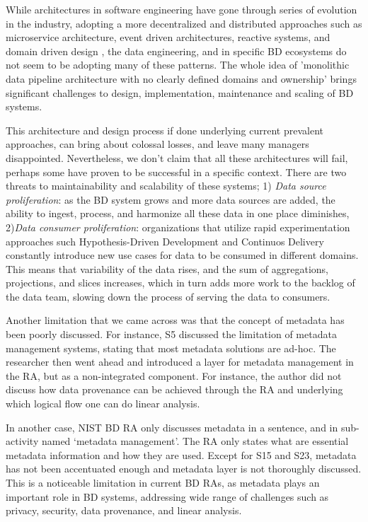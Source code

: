 \documentclass[review]{elsarticle}
\begin{document}
While architectures in software engineering have gone through series of evolution in the industry, adopting a more decentralized and distributed approaches such as microservice architecture, event driven architectures, reactive systems, and domain driven design , the data engineering, and in specific BD ecosystems do not seem to be adopting many of these patterns. The whole idea of 'monolithic data
pipeline architecture with no clearly defined domains and ownership' brings significant challenges to design, implementation, maintenance and scaling of BD systems.

This architecture and design process if done underlying current prevalent approaches, can bring about colossal losses, and leave many managers disappointed.
Nevertheless, we don't claim that all these architectures will fail, perhaps some have proven to be successful in a specific context. There are two threats to maintainability and scalability of these systems; 1) \emph{Data source proliferation}: as the BD system grows and more data
sources are added, the ability to ingest, process, and harmonize all these data in one place diminishes, 2)\emph{Data consumer proliferation}: organizations that utilize rapid experimentation approaches such Hypothesis-Driven Development and Continuos Delivery constantly introduce new use cases for data to be consumed in different domains. This means that variability of the data rises, and the sum of aggregations, projections, and slices increases, which in turn adds more work to the backlog of the data team, slowing
down the process of serving the data to consumers.

Another limitation that we came across was that the concept of metadata has been poorly discussed. For instance, S5 discussed the limitation of metadata management systems, stating that most metadata solutions are ad-hoc. The researcher then went ahead and introduced a layer for metadata management in the RA, but as a non-integrated component. For instance, the author did not discuss how data provenance can be achieved through the RA and underlying which logical flow one can do linear analysis. 

In another case, NIST BD RA only discusses metadata in a sentence, and in sub-activity named ‘metadata management’. The RA only states what are essential metadata information and how they are used. Except for S15 and S23, metadata has not been accentuated enough and metadata layer is not thoroughly discussed. This is a noticeable limitation in current BD RAs, as metadata plays an important role in BD systems, addressing wide range of challenges such as privacy, security, data provenance, and linear analysis. 
\end{document}
